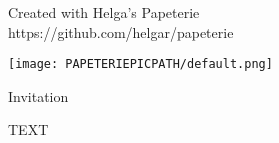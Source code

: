 \documentclass[a5paper,landscape]{scrartcl}
\begin{document}
\begin{multicols}{2}

\begin{center}
\vspace{2cm}

\vspace*{\fill}

{\color{grey}\tiny{} Created with Helga's Papeterie\\ https://github.com/helgar/papeterie \par }

\end{center}

\columnbreak

  \begin{center}
    \centering\texttt{[image: PAPETERIEPICPATH/default.png]}

    \vspace{1cm}

    {\huge\calligra Invitation}
  \end{center}

\end{multicols}

\pagebreak

\begin{multicols}{2}

\begin{center}
  \vspace{5cm}
\end{center}

\columnbreak

TEXT

\end{multicols}
\end{document}
